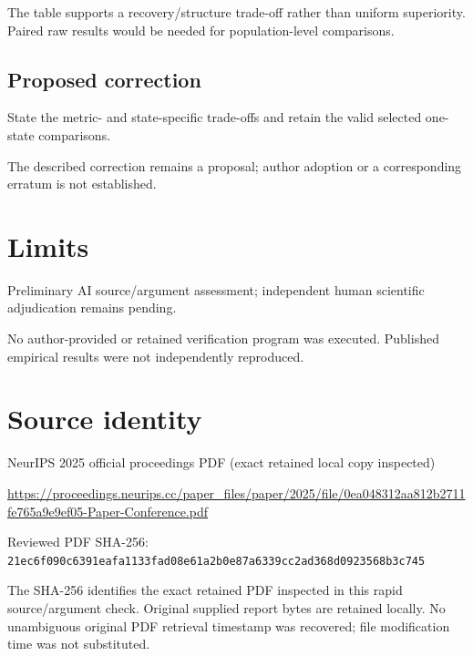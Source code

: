 \documentclass[11pt]{article}
\begin{document}
The table supports a recovery/structure trade-off rather than uniform superiority. Paired raw results would be needed for population-level comparisons.

\subsection*{Proposed correction}

State the metric- and state-specific trade-offs and retain the valid selected one-state comparisons.

The described correction remains a proposal; author adoption or a corresponding erratum is not established.

\section*{Limits}

Preliminary AI source/argument assessment; independent human scientific adjudication remains pending.\par

No author-provided or retained verification program was executed. Published empirical results were not independently reproduced.\par

\section*{Source identity}

NeurIPS 2025 official proceedings PDF (exact retained local copy inspected)

\url{https://proceedings.neurips.cc/paper_files/paper/2025/file/0ea048312aa812b2711fe765a9e9ef05-Paper-Conference.pdf}

Reviewed PDF SHA-256: \nolinkurl{21ec6f090c6391eafa1133fad08e61a2b0e87a6339cc2ad368d0923568b3c745}

The SHA-256 identifies the exact retained PDF inspected in this rapid source/argument check. Original supplied report bytes are retained locally. No unambiguous original PDF retrieval timestamp was recovered; file modification time was not substituted.
\end{document}
